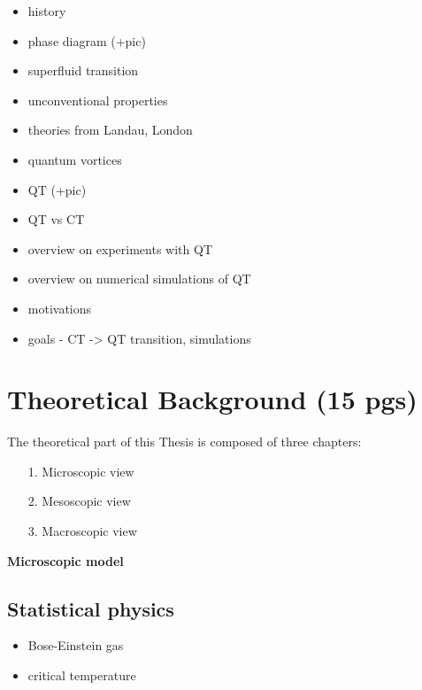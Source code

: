 \documentclass[a4paper, 12pt]{report}
\newcommand{\<}{\langle} %
\renewcommand{\>}{\rangle} %
\begin{document}
\begin{itemize}

	\item history
	\item phase diagram (+pic)
	\item superfluid transition
	\item unconventional properties
	\item theories from Landau, London
	\item quantum vortices
	\item QT (+pic)
	\item QT vs CT
	\item overview on experiments with QT
	\item overview on numerical simulations of QT
	\item motivations
	\item goals - CT -> QT transition, simulations
	
\end{itemize}

\newpage
\chapter{Theoretical Background (15 pgs)}

The theoretical part of this Thesis is composed of three chapters:

\begin{itemize}
	\item[1.] Microscopic view

	\item[2.] Mesoscopic view

	\item[3.] Macroscopic view

\end{itemize}
\vspace{1cm}

\newpage

{\Huge \bfseries Microscopic model}
\vspace{0.3cm}

\section{Statistical physics}
\begin{itemize}
	\item Bose-Einstein gas
	\item critical temperature
\end{itemize}
\end{document}
